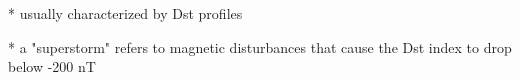 
* usually characterized by Dst profiles

* a "superstorm" refers to magnetic disturbances that cause the Dst
index to drop below -200 nT

